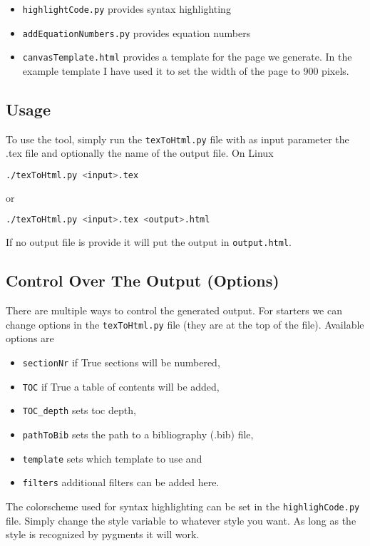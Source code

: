 \documentclass[11pt, a4paper]{article}
\begin{document}
	\begin{itemize}
		\item \lstinline|highlightCode.py| provides syntax highlighting
		\item \lstinline|addEquationNumbers.py| provides equation numbers
		\item \lstinline|canvasTemplate.html| provides a template for the page we generate. In the example template I have used it to set the width of the page to 900 pixels.
	\end{itemize}

	\subsection{Usage}
	To use the tool, simply run the \lstinline|texToHtml.py| file with as input parameter the .tex file and optionally the name of the output file. On Linux
	\begin{lstlisting}[language=bash]
	./texToHtml.py <input>.tex
	\end{lstlisting}
	or
	\begin{lstlisting}[language=bash]
	./texToHtml.py <input>.tex <output>.html
	\end{lstlisting} 
	If no output file is provide it will put the output in \lstinline|output.html|.
	
	\subsection{Control Over The Output (Options)}
	There are multiple ways to control the generated output. For starters we can change options in the \lstinline|texToHtml.py| file (they are at the top of the file). Available options are
	\begin{itemize}
		\item \lstinline|sectionNr| if True sections will be numbered,
		\item \lstinline|TOC| if True a table of contents will be added,
		\item \lstinline|TOC_depth| sets toc depth,
		\item \lstinline|pathToBib| sets the path to a bibliography (.bib) file,
		\item \lstinline|template| sets which template to use and
		\item \lstinline|filters| additional filters can be added here.
	\end{itemize}

	The colorscheme used for syntax highlighting can be set in the \lstinline|highlighCode.py| file. Simply change the style variable to whatever style you want. As long as the style is recognized by pygments it will work.
	
\end{document}
